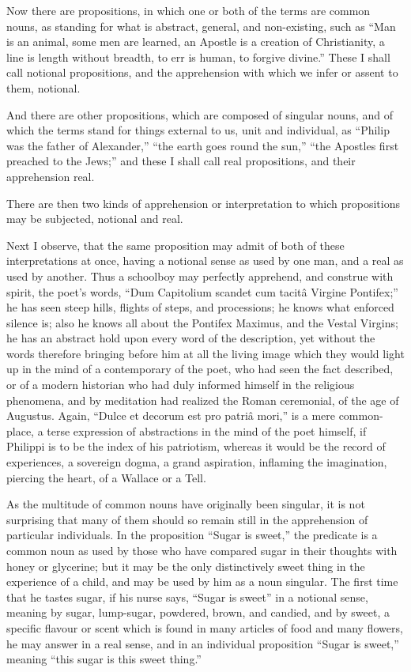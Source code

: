Now there are propositions, in which one or both of the terms are
common nouns, as standing for what is abstract, general, and
non-existing, such as ``Man is an animal, some men are learned, an
Apostle is a creation of Christianity, a line is length without
breadth, to err is human, to forgive divine.'' These I shall call
notional propositions, and the apprehension with which we infer or
assent to them, notional.

And there are other propositions, which are composed of singular
nouns, and of which the terms stand for things external to us,
unit and individual, as ``Philip was the father of
Alexander,'' ``the earth goes round the sun,'' ``the
Apostles first preached to the Jews;'' and these I shall call real
propositions, and their apprehension real.

There are then two kinds of apprehension or interpretation to which
propositions may be subjected, notional and real.

Next I observe, that the same proposition may admit of both of
these interpretations at once, having a notional sense as used by one
man, and a real as used by another. Thus a schoolboy may perfectly
apprehend, and construe with spirit, the poet's words, ``Dum
Capitolium scandet cum tacitâ Virgine Pontifex;'' he has seen
steep hills, flights of steps, and processions; he knows what enforced
silence is; also he knows all about the Pontifex Maximus, and the
Vestal Virgins; he has an abstract hold upon every word of the
description, yet without the words therefore bringing before him at
all the living image which they would light up in the mind of a
contemporary of the poet, who had seen the fact described, or of a
modern historian who had duly informed himself in the religious
phenomena, and by meditation had realized the Roman ceremonial, of the
age of Augustus. Again, ``Dulce et decorum est pro patriâ mori,''
is a mere common-place, a terse expression of abstractions in the mind
of the poet himself, if Philippi is to be the index of his patriotism,
whereas it would be the record of experiences, a sovereign dogma, a
grand aspiration, inflaming the imagination, piercing the heart, of a
Wallace or a Tell.

As the multitude of common nouns have originally been singular, it
is not surprising that many of them should so remain still in the
apprehension of particular individuals. In the proposition ``Sugar
is sweet,'' the predicate is a common noun as used by those who
have compared sugar in their thoughts with honey or glycerine; but it
may be the only distinctively sweet thing in the experience of a
child, and may be used by him as a noun singular. The first time that
he tastes sugar, if his nurse says, ``Sugar is sweet'' in a
notional sense, meaning by sugar, lump-sugar, powdered, brown, and
candied, and by sweet, a specific flavour or scent which is found in
many articles of food and many flowers, he may answer in a real sense,
and in an individual proposition ``Sugar is sweet,'' meaning
``this sugar is this sweet thing.''

